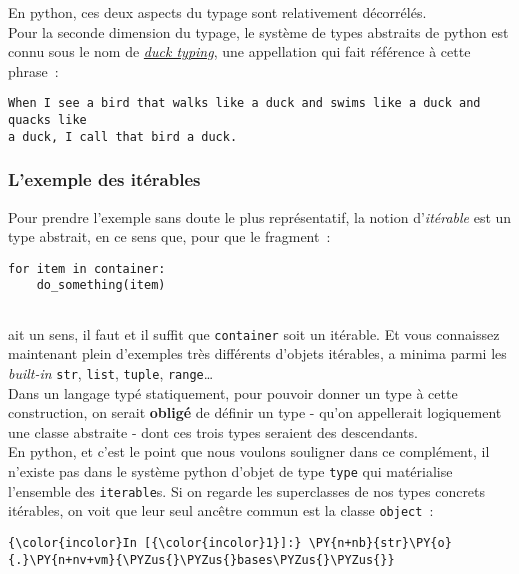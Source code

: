     En python, ces deux aspects du typage sont relativement décorrélés.\\

    Pour la seconde dimension du typage, le système de types abstraits de
python est connu sous le nom de
\href{http://en.wikipedia.org/wiki/Duck_typing}{\emph{duck typing}}, une
appellation qui fait référence à cette phrase~:

\begin{verbatim}
When I see a bird that walks like a duck and swims like a duck and quacks like
a duck, I call that bird a duck.
\end{verbatim}

    \hypertarget{lexemple-des-ituxe9rables}{%
\subsubsection{L'exemple des
itérables}\label{lexemple-des-ituxe9rables}}

    Pour prendre l'exemple sans doute le plus représentatif, la notion
d'\emph{itérable} est un type abstrait, en ce sens que, pour que le
fragment~:

\begin{verbatim}
for item in container:
    do_something(item)
    
\end{verbatim}

ait un sens, il faut et il suffit que \texttt{container} soit un
itérable. Et vous connaissez maintenant plein d'exemples très différents
d'objets itérables, a minima parmi les \emph{built-in} \texttt{str},
\texttt{list}, \texttt{tuple}, \texttt{range}\ldots{}\\

    Dans un langage typé statiquement, pour pouvoir donner un type à cette
construction, on serait \textbf{obligé} de définir un type - qu'on
appellerait logiquement une classe abstraite - dont ces trois types
seraient des descendants.\\

    En python, et c'est le point que nous voulons souligner dans ce
complément, il n'existe pas dans le système python d'objet de type
\texttt{type} qui matérialise l'ensemble des \texttt{iterable}s. Si on
regarde les superclasses de nos types concrets itérables, on voit que
leur seul ancêtre commun est la classe \texttt{object}~:

    \begin{Verbatim}[commandchars=\\\{\}]
{\color{incolor}In [{\color{incolor}1}]:} \PY{n+nb}{str}\PY{o}{.}\PY{n+nv+vm}{\PYZus{}\PYZus{}bases\PYZus{}\PYZus{}}
\end{Verbatim}


